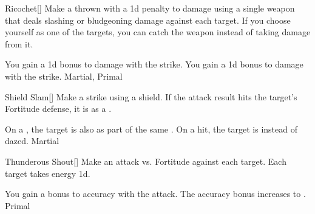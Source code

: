 \lowercase{\hypertarget{maneuver:Ricochet}{}}\label{maneuver:Ricochet}
\hypertarget{maneuver:Ricochet}{}
\begin{freeability}[Rank 3]{Ricochet}[]
Make a thrown  with a \minus1d penalty to damage using a single weapon that deals slashing or bludgeoning damage against each target.
If you choose yourself as one of the targets, you can catch the weapon instead of taking damage from it.

\rankline
{} You gain a \plus1d bonus to damage with the strike.
 You gain a \plus1d bonus to damage with the strike.
 Martial, Primal
\end{freeability}
\vspace{0.25em}



\lowercase{\hypertarget{maneuver:Shield Slam}{}}\label{maneuver:Shield Slam}
\hypertarget{maneuver:Shield Slam}{}
\begin{freeability}[Rank 3]{Shield Slam}[]
Make a strike using a shield.
If the attack result hits the target's Fortitude defense,
it is  as a .

\rankline
{} On a , the target is also  as part of the same .
 On a hit, the target is  instead of dazed.
 Martial
\end{freeability}
\vspace{0.25em}



\lowercase{\hypertarget{maneuver:Thunderous Shout}{}}\label{maneuver:Thunderous Shout}
\hypertarget{maneuver:Thunderous Shout}{}
\begin{freeability}[Rank 3]{Thunderous Shout}[]
Make an attack vs. Fortitude against each target.
\hit Each target takes energy  \minus1d.

\rankline
{} You gain a  bonus to accuracy with the attack.
 The accuracy bonus increases to .
 Primal
\end{freeability}
\vspace{0.25em}



